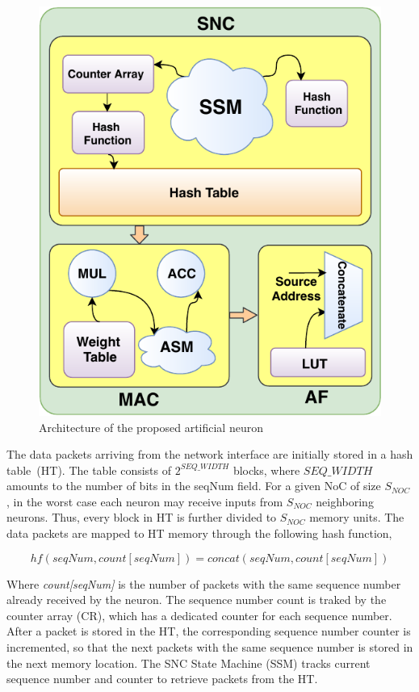 \begin{figure}
    \centering
    \includegraphics[width =0.8\columnwidth]{Figures/overall2.pdf}
    \caption{Architecture of the proposed artificial neuron}
    \label{fig:neuron}
\end{figure}

The data packets arriving from the network interface are initially stored in a hash table~(HT). 
The table consists of $2^{SEQ\_WIDTH}$ blocks, where $SEQ\_WIDTH$ amounts to the number of bits in the seqNum field. 
For a given NoC of size $S_{NOC}$, in the worst case each neuron may receive inputs from $S_{NOC}$ neighboring neurons. 
Thus, every block in HT is further divided to $S_{NOC}$ memory units. 
The data packets are mapped to HT memory through the following hash function,

\begin{equation}
hf(seqNum,count[seqNum]) = concat(seqNum,count[seqNum])
\label{equation:hf}
\end{equation}

Where \emph{count[seqNum]} is the number of packets with the same sequence number already received by the neuron.
The sequence number count is traked by the counter array (CR), which has a dedicated counter for each sequence number. 
After a packet is stored in the HT, the corresponding sequence number counter is incremented, so that the next packets with the same sequence number is stored in the next memory location. 
The SNC State Machine (SSM) tracks current sequence number and counter to retrieve packets from the HT. 

